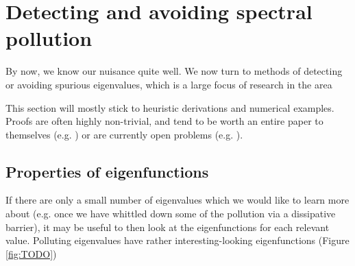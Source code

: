 \documentclass[../main.tex]{subfiles}
\begin{document}
\section{Detecting and avoiding spectral pollution}
By now, we know our nuisance quite well. We now turn to methods of detecting or avoiding spurious eigenvalues, which is a large focus of research in the area 

This section will mostly stick to heuristic derivations and numerical examples. Proofs are often highly non-trivial, and tend to be worth an entire paper to themselves (e.g. \cite{soussi2006convergence}) or are currently open problems (e.g. \cite{chandler-wilde2012spectrum}).

\subsection{Properties of eigenfunctions}
If there are only a small number of eigenvalues which we would like to learn more about (e.g. once we have whittled down some of the pollution via a dissipative barrier), it may be useful to then look at the eigenfunctions for each relevant value. Polluting eigenvalues have rather interesting-looking eigenfunctions (Figure \ref{fig:TODO})
\end{document}

